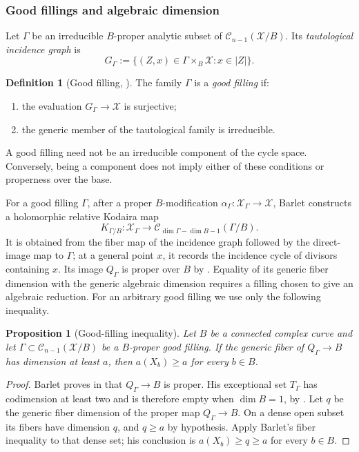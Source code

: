 \documentclass[11pt]{amsart}
\numberwithin{equation}{section}
\theoremstyle{plain}
\newtheorem{prop}[thm]{Proposition}
\theoremstyle{definition}
\newtheorem{defn}[thm]{Definition}
\newcommand{\cC}{\mathcal C}
\newcommand{\cX}{\mathcal X}
\begin{document}
\subsubsection{Good fillings and algebraic dimension}
Let $\Gamma$ be an irreducible $B$-proper analytic subset of
$\cC_{n-1}(\cX/B)$.  Its \emph{tautological incidence graph} is
\[
 G_\Gamma:=\{(Z,x)\in\Gamma\times_B\cX:x\in|Z|\}.
\]

\begin{defn}[Good filling, {\cite[\S~2.2]{Ba15}}]
\label{def:revised-good-filling}
The family $\Gamma$ is a \emph{good filling} if:
\begin{enumerate}[$(i)$]
\item the evaluation $G_\Gamma\to\cX$ is surjective;
\item the generic member of the tautological family is irreducible.
\end{enumerate}
A good filling need not be an irreducible component of the cycle space.
Conversely, being a component does not imply either of these conditions
or properness over the base.
\end{defn}

For a good filling $\Gamma$, after a proper $B$-modification
$\alpha_\Gamma:\cX_\Gamma\to\cX$, Barlet constructs a holomorphic
relative Kodaira map
\[
 K_{\Gamma/B}:\cX_\Gamma\longrightarrow
 \cC_{\dim\Gamma-\dim B-1}(\Gamma/B).
\]
It is obtained from the fiber map of the incidence graph followed by
the direct-image map to $\Gamma$; at a general point $x$, it records
the incidence cycle of divisors containing $x$.
Its image $Q_\Gamma$ is proper over $B$ by
\cite[Lemma~2.2.2]{Ba15}.  Equality of its generic fiber dimension with
the generic algebraic dimension requires a filling chosen to give an
algebraic reduction.  For an arbitrary good filling we use only the
following inequality.

\begin{prop}[Good-filling inequality]
\label{prop:revised-barlet-endgame}
Let $B$ be a connected complex curve and let
$\Gamma\subset\cC_{n-1}(\cX/B)$ be a $B$-proper good filling.
If the generic fiber of $Q_\Gamma\to B$ has dimension at least $a$,
then $a(X_b)\ge a$ for every $b\in B$.
\end{prop}

\begin{proof}
Barlet proves in \cite[Lemma~2.2.2]{Ba15} that $Q_\Gamma\to B$ is proper.
His exceptional set $T_\Gamma$ has
codimension at least two and is therefore empty when $\dim B=1$, by
\cite[Lemma~2.2.1]{Ba15}.  Let $q$ be the generic fiber
dimension of the proper map $Q_\Gamma\to B$.  On a dense open subset its
fibers have dimension $q$, and $q\ge a$ by hypothesis.  Apply Barlet's
fiber inequality \cite[Lemma~2.2.3]{Ba15} to that dense set;
his conclusion
is $a(X_b)\ge q\ge a$ for every $b\in B$.
\end{proof}
\end{document}
